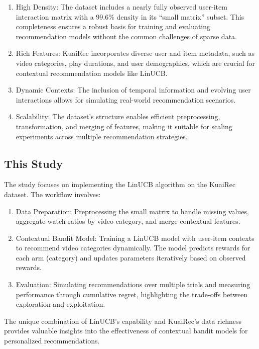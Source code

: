 \begin{enumerate}
    \item High Density: The dataset includes a nearly fully observed user-item interaction matrix with a $99.6\%$ density in its ``small matrix'' subset. This completeness ensures a robust basis for training and evaluating recommendation models without the common challenges of sparse data.
    \item Rich Features: KuaiRec incorporates diverse user and item metadata, such as video categories, play durations, and user demographics, which are crucial for contextual recommendation models like LinUCB.
    \item Dynamic Contexts: The inclusion of temporal information and evolving user interactions allows for simulating real-world recommendation scenarios.
    \item Scalability: The dataset's structure enables efficient preprocessing, transformation, and merging of features, making it suitable for scaling experiments across multiple recommendation strategies.
\end{enumerate}

\subsection{This Study}

The study focuses on implementing the LinUCB algorithm on the KuaiRec dataset. The workflow involves:

\begin{enumerate}
    \item Data Preparation: Preprocessing the small matrix to handle missing values, aggregate watch ratios by video category, and merge contextual features.
    \item Contextual Bandit Model: Training a LinUCB model with user-item contexts to recommend video categories dynamically. The model predicts rewards for each arm (category) and updates parameters iteratively based on observed rewards.
    \item Evaluation: Simulating recommendations over multiple trials and measuring performance through cumulative regret, highlighting the trade-offs between exploration and exploitation.
\end{enumerate}

The unique combination of LinUCB's capability and KuaiRec's data richness provides valuable insights into the effectiveness of contextual bandit models for personalized recommendations. 